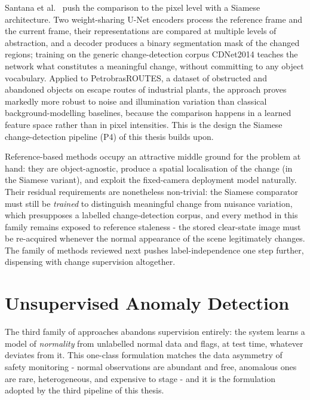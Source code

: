 Santana et al.~\cite{Santana2020} push the comparison to the pixel level with
a Siamese architecture. Two weight-sharing U-Net encoders process the reference
frame and the current frame, their representations are compared at multiple
levels of abstraction, and a decoder produces a binary segmentation mask of the
changed regions; training on the generic change-detection corpus CDNet2014
teaches the network what constitutes a meaningful change, without committing to
any object vocabulary. Applied to PetrobrasROUTES, a dataset of obstructed and
abandoned objects on escape routes of industrial plants, the approach proves
markedly more robust to noise and illumination variation than classical
background-modelling baselines, because the comparison happens in a learned
feature space rather than in pixel intensities. This is the design the Siamese
change-detection pipeline (P4) of this thesis builds upon.

Reference-based methods occupy an attractive middle ground for the problem at
hand: they are object-agnostic, produce a spatial localisation of the change
(in the Siamese variant), and exploit the fixed-camera deployment model
naturally. Their residual requirements are nonetheless non-trivial: the
Siamese comparator must still be \emph{trained} to distinguish meaningful
change from nuisance variation, which presupposes a labelled change-detection
corpus, and every method in this family remains exposed to reference staleness
- the stored clear-state image must be re-acquired whenever the normal
appearance of the scene legitimately changes. The family of methods reviewed
next pushes label-independence one step further, dispensing with change
supervision altogether.

\section{Unsupervised Anomaly Detection}
\label{sec:sota-anomaly}

The third family of approaches abandons supervision entirely: the system learns
a model of \emph{normality} from unlabelled normal data and flags, at test time,
whatever deviates from it. This one-class formulation matches the data
asymmetry of safety monitoring - normal observations are abundant and free,
anomalous ones are rare, heterogeneous, and expensive to stage - and it is the
formulation adopted by the third pipeline of this thesis.

